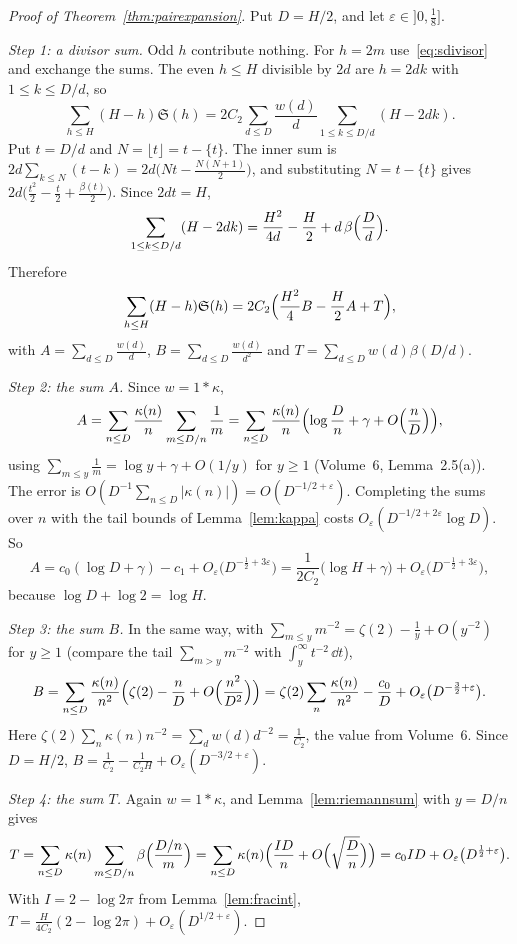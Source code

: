 \begin{proof}[Proof of Theorem~\ref{thm:pairexpansion}]
Put $D=H/2$, and let $\varepsilon\in]0,\frac18]$.

\emph{Step 1: a divisor sum.} Odd $h$ contribute nothing. For $h=2m$ use~\eqref{eq:sdivisor} and exchange the sums. The even $h\le H$ divisible by $2d$ are $h=2dk$ with $1\le k\le D/d$, so
\[
\sum_{h\le H}(H-h)\mathfrak S(h)=2C_2\sum_{d\le D}\frac{w(d)}d\sum_{1\le k\le D/d}(H-2dk).
\]
Put $t=D/d$ and $N=\lfloor t\rfloor=t-\{t\}$. The inner sum is $2d\sum_{k\le N}(t-k)=2d\bigl(Nt-\frac{N(N+1)}2\bigr)$, and substituting $N=t-\{t\}$ gives $2d\bigl(\frac{t^2}2-\frac t2+\frac{\beta(t)}2\bigr)$. Since $2dt=H$,
\[
\sum_{1\le k\le D/d}(H-2dk)=\frac{H^2}{4d}-\frac H2+d\,\beta\Bigl(\frac Dd\Bigr).
\]
Therefore
\begin{equation}\label{eq:threesums}
\sum_{h\le H}(H-h)\mathfrak S(h)=2C_2\Bigl(\frac{H^2}4B-\frac H2A+T\Bigr),
\end{equation}
with $A=\sum_{d\le D}\frac{w(d)}d$, $B=\sum_{d\le D}\frac{w(d)}{d^2}$ and $T=\sum_{d\le D}w(d)\beta(D/d)$.

\emph{Step 2: the sum $A$.} Since $w=1*\kappa$,
\[
A=\sum_{n\le D}\frac{\kappa(n)}n\sum_{m\le D/n}\frac1m=\sum_{n\le D}\frac{\kappa(n)}n\Bigl(\log\frac Dn+\gamma+O\Bigl(\frac nD\Bigr)\Bigr),
\]
using $\sum_{m\le y}\frac1m=\log y+\gamma+O(1/y)$ for $y\ge1$ (Volume~6, Lemma~2.5(a)). The error is $O(D^{-1}\sum_{n\le D}|\kappa(n)|)=O(D^{-1/2+\varepsilon})$. Completing the sums over $n$ with the tail bounds of Lemma~\ref{lem:kappa} costs $O_\varepsilon(D^{-1/2+2\varepsilon}\log D)$. So
\[
A=c_0(\log D+\gamma)-c_1+O_\varepsilon\bigl(D^{-\frac12+3\varepsilon}\bigr)=\frac1{2C_2}\bigl(\log H+\gamma\bigr)+O_\varepsilon\bigl(D^{-\frac12+3\varepsilon}\bigr),
\]
because $\log D+\log2=\log H$.

\emph{Step 3: the sum $B$.} In the same way, with $\sum_{m\le y}m^{-2}=\zeta(2)-\frac1y+O(y^{-2})$ for $y\ge1$ (compare the tail $\sum_{m>y}m^{-2}$ with $\int_y^\infty t^{-2}\,\dd t$),
\[
B=\sum_{n\le D}\frac{\kappa(n)}{n^2}\Bigl(\zeta(2)-\frac nD+O\Bigl(\frac{n^2}{D^2}\Bigr)\Bigr)=\zeta(2)\sum_n\frac{\kappa(n)}{n^2}-\frac{c_0}D+O_\varepsilon\bigl(D^{-\frac32+\varepsilon}\bigr).
\]
Here $\zeta(2)\sum_n\kappa(n)n^{-2}=\sum_dw(d)d^{-2}=\frac1{C_2}$, the value from Volume~6. Since $D=H/2$, $B=\frac1{C_2}-\frac1{C_2H}+O_\varepsilon(D^{-3/2+\varepsilon})$.

\emph{Step 4: the sum $T$.} Again $w=1*\kappa$, and Lemma~\ref{lem:riemannsum} with $y=D/n$ gives
\[
T=\sum_{n\le D}\kappa(n)\sum_{m\le D/n}\beta\Bigl(\frac{D/n}m\Bigr)=\sum_{n\le D}\kappa(n)\Bigl(\frac{ID}n+O\Bigl(\sqrt{\frac Dn}\Bigr)\Bigr)=c_0ID+O_\varepsilon\bigl(D^{\frac12+\varepsilon}\bigr).
\]
With $I=2-\log2\pi$ from Lemma~\ref{lem:fracint}, $T=\frac{H}{4C_2}(2-\log2\pi)+O_\varepsilon(D^{1/2+\varepsilon})$.


\end{proof}

